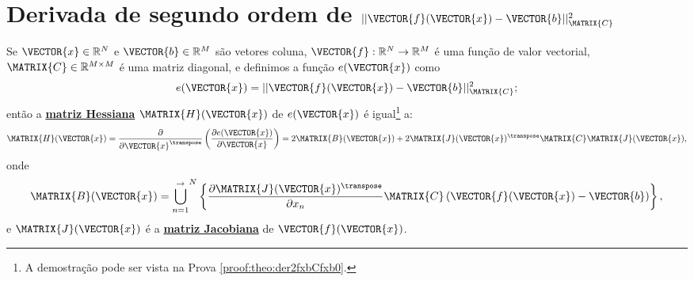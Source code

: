 
\section{Derivada de segundo ordem de $||\VECTOR{f}(\VECTOR{x})-\VECTOR{b}||_{\MATRIX{C}}^2$ 
}



\begin{theorem}\label{theo:der2fxbCfxb0}
Se
$\VECTOR{x}\in \mathbb{R}^N$ e 
$\VECTOR{b}\in \mathbb{R}^M$ são vetores coluna,  
$\VECTOR{f}: \mathbb{R}^{N}\rightarrow \mathbb{R}^{M}$ é uma função de valor vectorial,
$\MATRIX{C} \in \mathbb{R}^{M\times M}$ é uma matriz diagonal, e
definimos a função $e(\VECTOR{x})$ como
\begin{equation}
e(\VECTOR{x})= ||\VECTOR{f}(\VECTOR{x})-\VECTOR{b}||_{\MATRIX{C}}^2;
\end{equation}
então a \hyperref[def:hessian]{\textbf{matriz Hessiana}} $\MATRIX{H}(\VECTOR{x})$ 
de $e(\VECTOR{x})$ é igual\footnote{A demostração pode ser vista na Prova \ref{proof:theo:der2fxbCfxb0}.} a:
\begin{equation}
\MATRIX{H}(\VECTOR{x}) = \frac{\partial}{\partial \VECTOR{x}^{\transpose}}\left(  
\frac{\partial e(\VECTOR{x}) }{\partial \VECTOR{x}} \right) = 2 \MATRIX{B}(\VECTOR{x})
+2 \MATRIX{J}(\VECTOR{x})^{\transpose}\MATRIX{C} \MATRIX{J}(\VECTOR{x}),
\end{equation}
onde 
\begin{equation}
 \MATRIX{B}(\VECTOR{x})=
{\bigcup\limits_{n=1}^{ \rightarrow }}^{N}\left\{ \frac{\partial \MATRIX{J}(\VECTOR{x})^{\transpose} }{\partial x_{n}} \MATRIX{C} \left( \VECTOR{f}(\VECTOR{x})-\VECTOR{b}\right) \right\},
\end{equation}
e $\MATRIX{J}(\VECTOR{x})$ é a \hyperref[def:jacobian]{\textbf{matriz Jacobiana}} de $\VECTOR{f}(\VECTOR{x})$.
\end{theorem}

